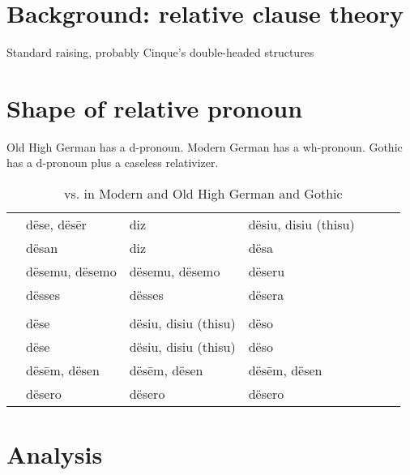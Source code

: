   \section{Background: relative clause theory}
Standard raising, probably Cinque's double-headed structures


  \section{Shape of relative pronoun}
Old High German has a d-pronoun. Modern German has a wh-pronoun. Gothic has a d-pronoun plus a caseless relativizer.


\begin{table}[h]\label{tbl:intextgoth}
	\center
	\caption { vs.  in Modern and Old High German and Gothic}
	\begin{minipage}{\linewidth}
		\begin{tabularx}{\textwidth}{c *{6}{Y}}
		\toprule
			&          &               &                \\
		\midrule
		 & dëse, dësēr			& diz							     &	dësiu, disiu (thisu) \\
			& dësan						&	diz		        	     &	dësa								 \\
			&	dësemu, dësemo	&	dësemu, dësemo	     & dëseru							   \\
     & dësses          & dësses               & dësera                \\
		\bottomrule
    \toprule
    	&          &               &                \\
    \midrule
     &  dëse           & dësiu, disiu (thisu) & dëso                  \\
     &  dëse           & dësiu, disiu (thisu) & dëso                  \\
     &  dësēm, dësen   & dësēm, dësen         & dësēm, dësen          \\
     &  dësero         & dësero               & dësero                \\
    \bottomrule
		\end{tabularx}
	\end{minipage}
\end{table}




  \section{Analysis}


